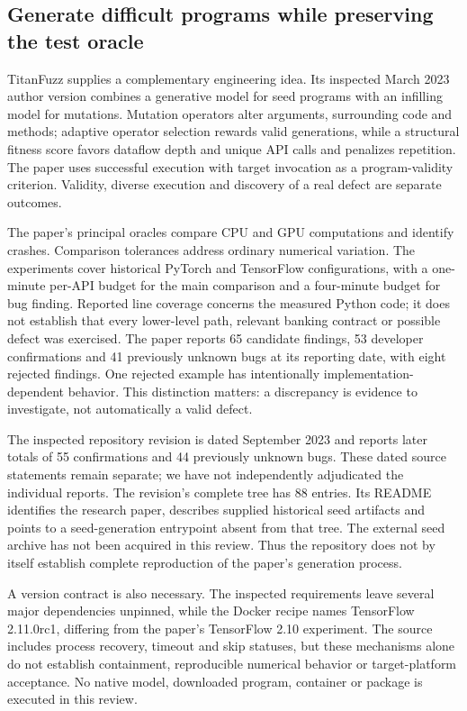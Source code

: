 \subsection{Generate difficult programs while preserving the test oracle}
TitanFuzz supplies a complementary engineering idea. Its inspected March 2023 author version combines a generative model for seed programs with an infilling model for mutations. Mutation operators alter arguments, surrounding code and methods; adaptive operator selection rewards valid generations, while a structural fitness score favors dataflow depth and unique API calls and penalizes repetition. The paper uses successful execution with target invocation as a program-validity criterion. Validity, diverse execution and discovery of a real defect are separate outcomes.~\citep{exec24_fuzzing_original}

The paper's principal oracles compare CPU and GPU computations and identify crashes. Comparison tolerances address ordinary numerical variation. The experiments cover historical PyTorch and TensorFlow configurations, with a one-minute per-API budget for the main comparison and a four-minute budget for bug finding. Reported line coverage concerns the measured Python code; it does not establish that every lower-level path, relevant banking contract or possible defect was exercised. The paper reports 65 candidate findings, 53 developer confirmations and 41 previously unknown bugs at its reporting date, with eight rejected findings. One rejected example has intentionally implementation-dependent behavior. This distinction matters: a discrepancy is evidence to investigate, not automatically a valid defect.~\citep{exec24_fuzzing_original}

The inspected repository revision is dated September 2023 and reports later totals of 55 confirmations and 44 previously unknown bugs. These dated source statements remain separate; we have not independently adjudicated the individual reports. The revision's complete tree has 88 entries. Its README identifies the research paper, describes supplied historical seed artifacts and points to a seed-generation entrypoint absent from that tree. The external seed archive has not been acquired in this review. Thus the repository does not by itself establish complete reproduction of the paper's generation process.~\citep{exec24_titanfuzz_source}

A version contract is also necessary. The inspected requirements leave several major dependencies unpinned, while the Docker recipe names TensorFlow 2.11.0rc1, differing from the paper's TensorFlow 2.10 experiment. The source includes process recovery, timeout and skip statuses, but these mechanisms alone do not establish containment, reproducible numerical behavior or target-platform acceptance. No native model, downloaded program, container or package is executed in this review.~\citep{exec24_titanfuzz_source}

